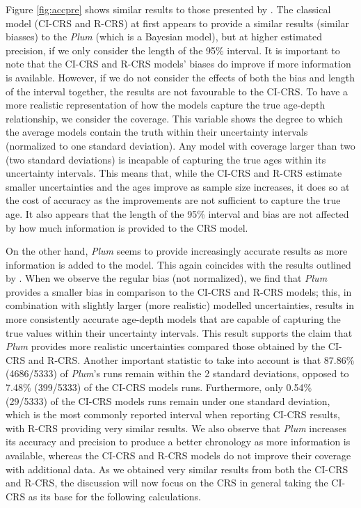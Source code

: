 \documentclass [10pt] {article}
\begin{document}
Figure \ref{fig:accpre} shows similar results to those presented by \citet{Blaauw2018}. 
The classical model (CI-CRS and R-CRS) at first appears to provide a similar results (similar biasses) to the \textit{Plum} (which is a Bayesian model), but at higher estimated precision, if we only consider the length of the 95\% interval. 
It is important to note that the CI-CRS and R-CRS models' biases do improve if more information is available.
However, if we do not consider the effects of both the bias and length of the interval together, the results are not favourable to the CI-CRS. 
To have a more realistic representation of how the models capture the true age-depth relationship, we consider the coverage. 
This variable shows the degree to which the average models contain the truth within their uncertainty intervals (normalized to one standard deviation). 
Any model with coverage larger than two (two standard deviations) is incapable of capturing the true ages within its uncertainty intervals.  
This means that, while the CI-CRS and R-CRS estimate smaller uncertainties and the ages improve as sample size increases, it does so at the cost of accuracy as the improvements are not sufficient to capture the true age.
It also appears that the length of the 95\% interval and bias are not affected by how much information is provided to the CRS model.

On the other hand, \textit{Plum} seems to provide increasingly accurate results as more information is added to the model.
This again coincides with the results outlined by \citet{Blaauw2018}. 
When we observe the regular bias (not normalized), we find that \textit{Plum} provides a smaller bias in comparison to the CI-CRS and R-CRS models; this, in combination with slightly larger (more realistic) modelled uncertainties, results in more consistently accurate age-depth models that are capable of capturing the true values within their uncertainty intervals. 
This result supports the claim that \textit{Plum} provides more realistic uncertainties compared those obtained by the CI-CRS and R-CRS. 
Another important statistic to take into account is that 87.86\% (4686/5333) of \textit{Plum}'s runs remain within the 2 standard deviations, opposed to 7.48\% (399/5333) of the CI-CRS models runs. 
Furthermore, only 0.54\% (29/5333) of the CI-CRS models runs remain under one standard deviation, which is the most commonly reported interval when reporting CI-CRS results, with R-CRS providing very similar results.
We also observe that \textit{Plum} increases its accuracy and precision to produce a better chronology as more information is available, whereas the CI-CRS and R-CRS models do not improve their coverage with additional data. 
As we obtained very similar results from both the CI-CRS and R-CRS, the discussion will now focus on the CRS in general taking the CI-CRS as its base for the following calculations.
\end{document}
